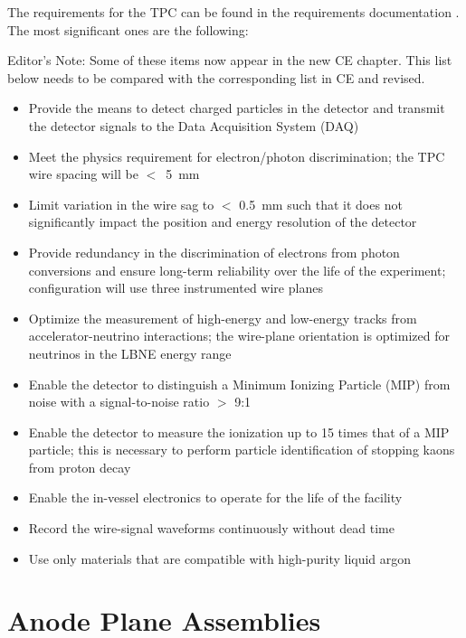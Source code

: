 The requirements for the TPC can be found in the requirements documentation \cite{lar-fd-req}. The most significant ones are the following:
\begin{editornote}
  Editor's Note:  Some of these items now appear in the new CE chapter.
  This list below needs to be compared with the corresponding list in CE and revised.
\end{editornote}

\begin{itemize}	
\item Provide the means to detect charged particles in the detector and transmit the detector signals to the Data Acquisition System (DAQ)
\item Meet the physics requirement for electron/photon discrimination;  the TPC wire spacing will be $<$~5~mm
\item Limit variation in the wire sag to $<$ 0.5~mm such that it does not significantly impact the position and energy resolution of the detector
\item Provide redundancy in the discrimination of electrons from photon conversions and ensure long-term reliability over the life of the experiment;  configuration will use three instrumented wire planes
\item Optimize the measurement of high-energy and low-energy tracks from accelerator-neutrino interactions; the wire-plane orientation is optimized for neutrinos in the LBNE energy range
\item Enable the detector to distinguish a Minimum Ionizing Particle (MIP) from noise with a signal-to-noise ratio $>$ 9:1
\item Enable the detector to measure the ionization up to 15 times that of a MIP particle; this is necessary to perform particle identification of stopping kaons from proton decay
\item Enable the in-vessel electronics to operate for the life of the facility
\item Record the wire-signal waveforms continuously without dead time
\item Use only materials that are compatible with high-purity liquid argon

\end{itemize}

\section{Anode Plane Assemblies}
\label{subsec:v5-tpc-chamber-apa}

